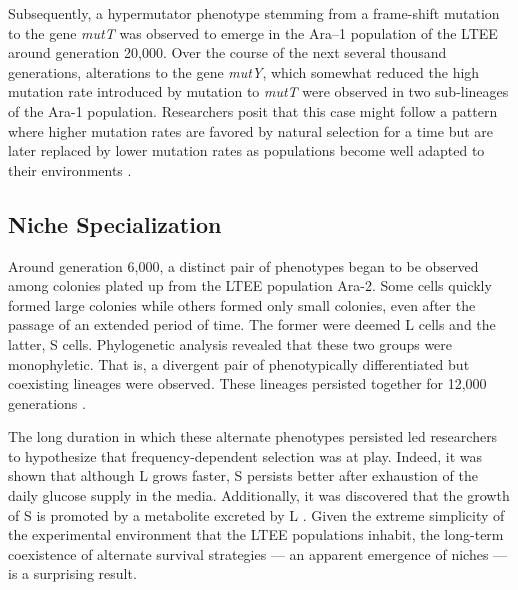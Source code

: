 Subsequently, a hypermutator phenotype stemming from a frame-shift mutation to the gene \textit{mutT} was observed to emerge in the Ara–1 population of the LTEE around generation 20,000.
Over the course of the next several thousand generations, alterations to the gene \textit{mutY}, which somewhat reduced the high mutation rate introduced by mutation to \textit{mutT} were observed in two sub-lineages of the Ara-1 population.
Researchers posit that this case might follow a pattern where higher mutation rates are favored by natural selection for a time but are later replaced by lower mutation rates as populations become well adapted to their environments \cite{Wielgoss2013MutationLoad.}.

\subsection{Niche Specialization} \label{sec:niche}
Around generation 6,000, a distinct pair of phenotypes began to be observed among colonies plated up from the LTEE population Ara-2. 
Some cells quickly formed large colonies while others formed only small colonies, even after the passage of an extended period of time.
The former were deemed L cells and the latter, S cells.
Phylogenetic analysis revealed that these two groups were monophyletic.
That is, a divergent pair of phenotypically differentiated but coexisting lineages were observed.
These lineages persisted together for 12,000 generations \cite{Rozen2005Long-termPolymorphism}.

The long duration in which these alternate phenotypes persisted led researchers to hypothesize that frequency-dependent selection was at play.
Indeed, it was shown that although L grows faster, S persists better after exhaustion of the daily glucose supply in the media.
Additionally, it was discovered that the growth of S is promoted by a metabolite excreted by L \cite{Rozen2005Long-termPolymorphism}.
Given the extreme simplicity of the experimental environment that the LTEE populations inhabit, the long-term coexistence of alternate survival strategies --- an apparent emergence of niches --- is a surprising result.
